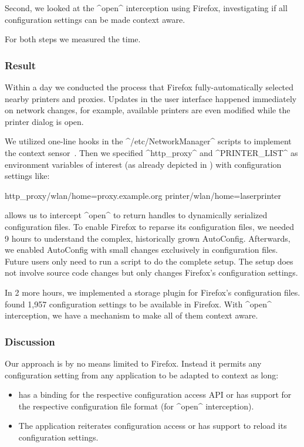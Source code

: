 Second, we looked at the ^open^ interception using Firefox, investigating if all configuration settings can be made context aware.

For both steps we measured the time.

\subsubsection{Result}

Within a day we conducted the process that Firefox fully-automatically selected nearby printers and proxies.
Updates in the user interface happened immediately on network changes, for example, available printers are even modified while the printer dialog is open.

We utilized one-line hooks in the ^/etc/NetworkManager^ scripts to implement the context sensor~\cite{raab2017introducing}.
Then we specified ^http_proxy^ and ^PRINTER_LIST^ as environment variables of interest (as already depicted in ) with configuration settings like:

\begin{code}[language=CfgElektra]
http_proxy/wlan/home=proxy.example.org
printer/wlan/home=laserprinter
\end{code}

\elektra{} allows us to intercept ^open^ to return handles to dynamically serialized configuration files.
To enable Firefox to reparse its configuration files, we needed 9 hours to understand the complex, historically grown AutoConfig.
Afterwards, we enabled AutoConfig with small changes exclusively in configuration files.
Future users only need to run a script to do the complete setup.
The setup does not involve source code changes but only changes Firefox's configuration settings.

In 2 more hours, we implemented a storage plugin for Firefox's configuration files.
\citet{jin2014configurations} found 1,957 configuration settings to be available in Firefox.
With ^open^ interception, we have a mechanism to make all of them context aware.


\subsubsection{Discussion}

Our approach is by no means limited to Firefox.
Instead it permits any configuration setting from any application to be adapted to context as long:
\begin{itemize}
\item \elektra{} has a binding for the respective configuration access API or has support for the respective configuration file format (for ^open^ interception).
\item The application reiterates configuration access or has support to reload its configuration settings.
\end{itemize}

